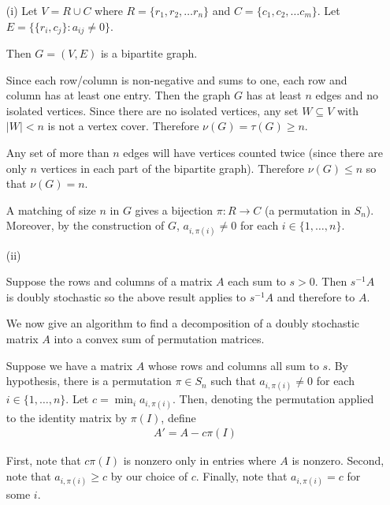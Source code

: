\documentclass[10pt]{article}
\begin{document}
\begin{solution}

\begin{enumerate}
    \item[(i)]
        Let \( V = R\cup C \) where \( R = \{r_1, r_2, \ldots r_n\} \) and \( C = \{c_1, c_2, \ldots c_m\} \). Let \( E = \{\{r_i,c_j\} : a_{ij} \neq 0\} \). 

        Then \( G = (V,E) \) is a bipartite graph.

        Since each row/column is non-negative and sums to one, each row and column has at least one entry. Then the graph \( G \) has at least \( n \) edges and no isolated vertices. Since there are no isolated vertices, any set \( W\subseteq V \) with \( |W| < n \) is not a vertex cover. Therefore \( \nu(G) = \tau(G) \geq n \).

        Any set of more than \( n \) edges will have vertices counted twice (since there are only \( n \) vertices in each part of the bipartite graph). Therefore \( \nu(G) \leq n \) so that \( \nu(G) = n \).

        A matching of size \( n \) in \( G \) gives a bijection \( \pi: R\to C \) (a permutation in \( S_n \)). Moreover, by the construction of \( G \), \( a_{i,\pi(i)} \neq 0 \) for each \( i\in \{1,\ldots, n\} \).


    \item[(ii)]

        Suppose the rows and columns of a matrix \( A \) each sum to \( s>0 \). Then \( s^{-1} A \) is doubly stochastic so the above result applies to \( s^{-1}A \) and therefore to \( A \).

        We now give an algorithm to find a decomposition of a doubly stochastic matrix \( A \) into a convex sum of permutation matrices.

        Suppose we have a matrix \( A \) whose rows and columns all sum to \( s \). By hypothesis, there is a permutation \( \pi\in S_n \) such that \( a_{i,\pi(i)} \neq 0 \) for each \( i\in\{1,\ldots, n\} \). Let \( c = \min_{i} a_{i,\pi(i)} \). Then, denoting the permutation applied to the identity matrix by \( \pi(I) \), define
        \begin{align*}
            A' = A-c\pi(I)
        \end{align*}
        
        First, note that \( c\pi(I) \) is nonzero only in entries where \( A \) is nonzero. Second, note that \( a_{i,\pi(i)} \geq c \) by our choice of \( c \). Finally, note that \( a_{i,\pi(i)} = c \) for some \( i \).


\end{enumerate}
\end{solution}
\end{document}
